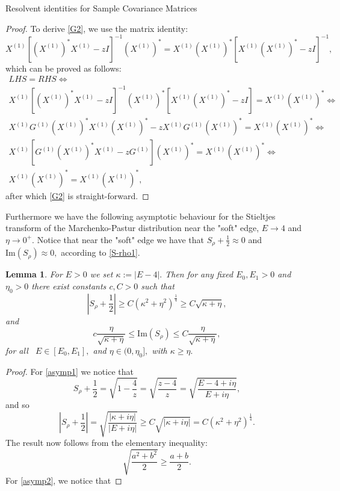 \documentclass[11pt, a4paper, oneside]{book}
\numberwithin{equation}{chapter}
\newcommand{\beq}{\begin{equation}}
\newcommand{\eeq}{\end{equation}}
\newtheorem{lem}[thm]{Lemma}
\begin{document}
\begin{section}{Resolvent identities for Sample Covariance Matrices}
\begin{proof}
    To derive \eqref{G2}, we use the matrix identity:
    \[
    X^{(1)} \left [ (X^{(1)})^* X^{(1)} - zI \right ]^{-1} (X^{(1)})^* =  X^{(1)} (X^{(1)})^*  \left [ X^{(1)} (X^{(1)})^*  - zI \right ]^{-1} ,
    \]
    which can be proved as follows:
    \begin{gather*}
        LHS = RHS \Leftrightarrow \\
        X^{(1)} \left [ (X^{(1)})^* X^{(1)} - zI \right ]^{-1} (X^{(1)})^* \left [ X^{(1)} (X^{(1)})^* - zI \right ] = X^{(1)} (X^{(1)})^* \Leftrightarrow \\
        X^{(1)} G^{(1)} (X^{(1)})^* X^{(1)} (X^{(1)})^* - zX^{(1)} G^{(1)} (X^{(1)})^* = X^{(1)} (X^{(1)})^* \Leftrightarrow \\
        X^{(1)} \left [ G^{(1)} (X^{(1)})^* X^{(1)} - z G^{(1)} \right ]  (X^{(1)})^* = X^{(1)} (X^{(1)})^* \Leftrightarrow \\
        X^{(1)} (X^{(1)})^* = X^{(1)} (X^{(1)})^* ,
    \end{gather*}
    after which \eqref{G2} is straight-forward.    
\end{proof}
%
Furthermore we have the following asymptotic behaviour for the Stieltjes transform of the Marchenko-Pastur distribution near the "soft" edge, $E \to 4$ and $\eta \to 0^+.$ Notice that near the "soft" edge we have that $S_{\rho} + \frac{1}{2} \approx 0$ and $\mathrm{Im} ( S_{\rho} ) \approx 0,$ according to \eqref{S-rho1}.
%
\begin{lem}
For $E>0$ we set $\kappa := |E-4|.$ Then for any fixed $E_0,E_1>0$ and $\eta_0>0$ there exist constants $c,C>0$ such that
%
\beq \label{asymp1} 
\left | S_{\rho} + \frac{1}{2} \right | \geq C ( \kappa^2   +\eta^2)^{\frac{1}{4}} \geq C\sqrt{\kappa+\eta},
\eeq
and
\beq \label{asymp2}
c \frac{\eta}{\sqrt{\kappa+\eta}} \leq \mathrm{Im} ( S_{\rho} ) \leq C \frac{\eta}{\sqrt{\kappa+\eta}} , 
\eeq
%
for all \ $E \in [E_0, E_1],$ and $\eta \in (0,\eta_0],$ with $\kappa \geq \eta .$
\end{lem}
%
\begin{proof}
    For \eqref{asymp1} we notice that
    \[
    S_{\rho} + \frac{1}{2} = \sqrt{1- \frac{4}{z}} = \sqrt{\frac{z-4}{z}} = \sqrt{\frac{E-4+i\eta}{E+i\eta}},
    \]
    and so
    \[
    \left | S_{\rho} + \frac{1}{2} \right | = \sqrt{\frac{|\kappa+i\eta|}{|E+i\eta|}} \geq C \sqrt{|\kappa+i\eta|} = C ( \kappa^2   +\eta^2)^{\frac{1}{4}}.
    \]
    The result now follows from the elementary inequality:
    \[
    \sqrt{\frac{a^2+b^2}{2}} \geq \frac{a+b}{2}.
    \]
    For \eqref{asymp2}, we notice that

\end{proof}
\end{section}
\end{document}
